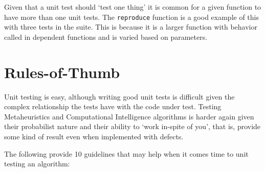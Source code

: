 \documentclass[a4paper, 11pt]{article}
\begin{document}
Given that a unit test should `test one thing' it is common for a given function to have more than one unit tests. The \texttt{reproduce} function is a good example of this with three tests in the suite. This is because it is a larger function with behavior called in dependent functions and is varied based on parameters.



%
%
\section{Rules-of-Thumb}
\label{sec:suggestions}
Unit testing is easy, although writing good unit tests is difficult given the complex relationship the tests have with the code under test. Testing Metaheuristics and Computational Intelligence algorithms is harder again given their probabilist nature and their ability to `work in-spite of you', that is, provide some kind of result even when implemented with defects.

The following provide 10 guidelines that may help when it comes time to unit testing an algorithm:
\end{document}
